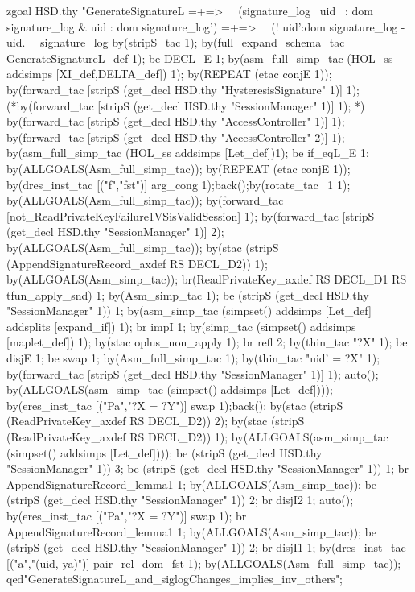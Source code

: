 \documentclass[a4paper,pdftex]{article}
\newenvironment{holz-proof}{\comment}{\endcomment}
\begin{document}
\begin{holz-proof}
zgoal HSD.thy
"GenerateSignatureL =+=>                                            \
\   (signature_log %
\    uid ~: dom signature_log & uid : dom signature_log') =+=>      \
\   (! uid':dom signature_log - {uid}.                              \
\                    signature_log %
by(stripS_tac 1);
by(full_expand_schema_tac GenerateSignatureL_def 1);
be DECL_E 1;
by(asm_full_simp_tac (HOL_ss addsimps [XI_def,DELTA_def]) 1); 
by(REPEAT (etac conjE 1));
by(forward_tac [stripS (get_decl HSD.thy "HysteresisSignature" 1)] 1);
(*by(forward_tac [stripS (get_decl HSD.thy "SessionManager" 1)] 1); *)
by(forward_tac [stripS (get_decl HSD.thy "AccessController" 1)] 1);
by(forward_tac [stripS (get_decl HSD.thy "AccessController" 2)] 1);
by(asm_full_simp_tac (HOL_ss addsimps [Let_def])1);
be if_eqL_E 1;
by(ALLGOALS(Asm_full_simp_tac));
by(REPEAT (etac conjE 1));
by(dres_inst_tac [("f","fst")] arg_cong 1);back();by(rotate_tac ~1 1);
by(ALLGOALS(Asm_full_simp_tac));
by(forward_tac [not_ReadPrivateKeyFailure1VSisValidSession] 1);
by(forward_tac [stripS (get_decl HSD.thy "SessionManager" 1)] 2);
by(ALLGOALS(Asm_full_simp_tac));
by(stac (stripS (AppendSignatureRecord_axdef RS DECL_D2)) 1);
by(ALLGOALS(Asm_simp_tac));
br(ReadPrivateKey_axdef RS DECL_D1 RS tfun_apply_snd) 1;
by(Asm_simp_tac 1);
be (stripS (get_decl HSD.thy "SessionManager" 1)) 1;
by(asm_simp_tac (simpset() addsimps [Let_def] addsplits [expand_if]) 1);
br impI 1;
by(simp_tac (simpset() addsimps [maplet_def]) 1);
by(stac oplus_non_apply 1);
br refl 2;
by(thin_tac "?X" 1);
be disjE 1;
be swap 1;
by(Asm_full_simp_tac 1);
by(thin_tac "uid' = ?X" 1);
by(forward_tac [stripS (get_decl HSD.thy "SessionManager" 1)] 1); 
auto();
by(ALLGOALS(asm_simp_tac (simpset() addsimps [Let_def])));
by(eres_inst_tac [("Pa","?X = ?Y")] swap 1);back();
by(stac (stripS (ReadPrivateKey_axdef RS DECL_D2)) 2);
by(stac (stripS (ReadPrivateKey_axdef RS DECL_D2)) 1);
by(ALLGOALS(asm_simp_tac (simpset() addsimps [Let_def])));
be (stripS (get_decl HSD.thy "SessionManager" 1)) 3;
be (stripS (get_decl HSD.thy "SessionManager" 1)) 1;
br AppendSignatureRecord_lemma1 1;
by(ALLGOALS(Asm_simp_tac));
be (stripS (get_decl HSD.thy "SessionManager" 1)) 2;
br disjI2 1;
auto();
by(eres_inst_tac [("Pa","?X = ?Y")] swap 1);
br AppendSignatureRecord_lemma1 1;
by(ALLGOALS(Asm_simp_tac));
be (stripS (get_decl HSD.thy "SessionManager" 1)) 2;
br disjI1 1;
by(dres_inst_tac [("a","(uid, ya)")] pair_rel_dom_fst 1);
by(ALLGOALS(Asm_full_simp_tac));
qed"GenerateSignatureL_and_siglogChanges_implies_inv_others";





\end{holz-proof}
\end{document}
